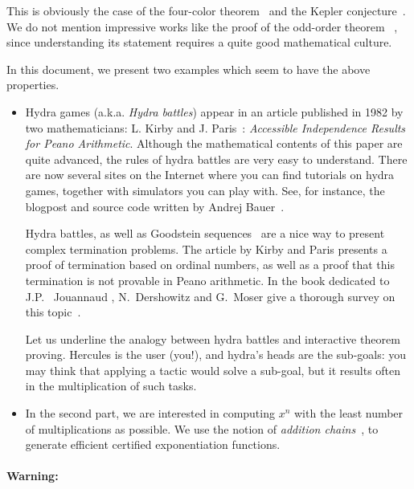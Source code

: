 \documentclass[a4paper]{book}
\begin{document}
This is obviously the case of the four-color theorem~\cite{fourcolors}  and the Kepler conjecture~\cite{flyspeck2015}. We do not mention impressive works like the proof of the odd-order theorem ~\cite{oddorderthm}, since understanding its statement requires a quite good mathematical culture.


In this document, we present two examples which seem to have the above properties.

\begin{itemize}
\item Hydra games (a.k.a. \emph{Hydra battles}) appear in an article published in 1982 by two mathematicians:
L. Kirby and J. Paris~\cite{KP82}: \emph{Accessible Independence Results for Peano Arithmetic}. 
Although the mathematical contents of this 
paper are quite advanced, the rules of hydra battles are very easy to understand. There are now several sites on the Internet where you can find tutorials on hydra games, together with simulators you can play with. See, for instance, the blogpost and source code written by Andrej Bauer~\cite{bauer2008,BauerHydra}.



Hydra battles, as well as Goodstein sequences~\cite{goodstein_1944, KP82}
are a nice way to present complex termination problems.
The article by Kirby and Paris presents a proof of termination
based on ordinal numbers, as well as a proof that this termination is not
provable in Peano arithmetic. In the book dedicated to 
J.P. ~Jouannaud \cite{HommageJPJ}, N.~Dershowitz and G.~Moser  give a thorough survey on this topic~\cite{Dershowitz2007}.

Let us underline the analogy between hydra battles and interactive theorem proving. Hercules is the user (you!), and hydra's heads are the sub-goals: you may think that applying a tactic would solve a sub-goal, but it results often in the multiplication of such tasks.

\item In the second part, we are interested in computing $x^n$ with the least number of multiplications as possible. We use the notion of \emph{addition chains}~\cite{brauer1939,DBLP:journals/ipl/BerstelB87}, to generate efficient certified exponentiation functions.
\end{itemize}

\paragraph*{Warning:}
\end{document}
